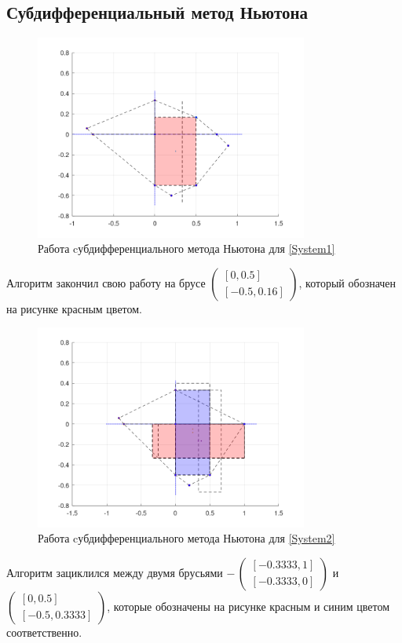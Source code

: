 \subsection{Субдифференциальный метод Ньютона}
\begin{figure}[H]
\centering
\includegraphics[width=0.8\textwidth]{Graphics/Newton1_boxes.png}
\caption{Работа cубдифференциального метода Ньютона для \eqref{System1}} 
\end{figure}
Алгоритм закончил свою работу на брусе $\begin{pmatrix}
    [   0,   0.5] \\
    [   -0.5,   0.16] \end{pmatrix}$, который обозначен на рисунке красным цветом.
\begin{figure}[H] \label{Cycle}
\centering
\includegraphics[width=0.8\textwidth]{Graphics/Newton2_boxes.png}
\caption{Работа cубдифференциального метода Ньютона для \eqref{System2}} 
\end{figure}
Алгоритм зациклился между двумя брусьями $-\,\begin{pmatrix}
    [   -0.3333,   1] \\
    [   -0.3333,   0] \end{pmatrix}$ и $\begin{pmatrix}
    [   0,   0.5] \\
    [   -0.5,   0.3333] \end{pmatrix}$, которые обозначены на рисунке красным и  синим цветом соответственно.